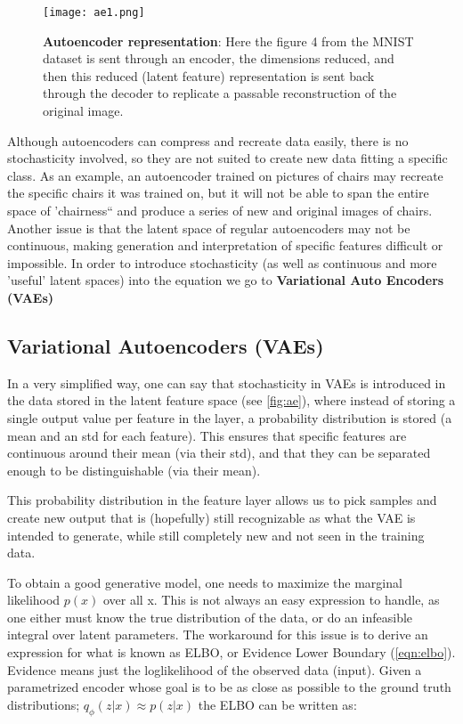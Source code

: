 \begin{figure}[!htb]
 \centering
 \texttt{[image: ae1.png]}
 \caption{\textbf{Autoencoder representation}: Here the figure 4 from the MNIST dataset is sent through an encoder, the dimensions reduced, and then this reduced (latent feature) representation is sent back through the decoder to replicate a passable reconstruction of the original image.}
 \label{fig:ae}
\end{figure}

Although autoencoders can compress and recreate data easily, there is no stochasticity involved, so they are not suited to create new data fitting a specific class. As an example, an autoencoder trained on pictures of chairs may recreate the specific chairs it was trained on, but it will not be able to span the entire space of 'chairness`` and produce a series of new and original images of chairs. Another issue is that the latent space of regular autoencoders may not be continuous, making generation and interpretation of specific features difficult or impossible.
In order to introduce stochasticity (as well as continuous and more 'useful' latent spaces) into the equation we go to \textbf{Variational Auto Encoders (VAEs)}

\subsection{Variational Autoencoders (VAEs)}
In a very simplified way, one can say that stochasticity in VAEs is introduced in the data stored in the latent feature space (see \autoref{fig:ae}), where instead of storing a single output value per feature in the layer, a probability distribution is stored (a mean and an std for each feature). This ensures that specific features are continuous around their mean (via their std), and that they can be separated enough to be distinguishable (via their mean).

This probability distribution in the feature layer allows us to pick samples and create new output that is (hopefully) still recognizable as what the VAE is intended to generate, while still completely new and not seen in the training data. 

To obtain a good generative model, one needs to maximize the marginal likelihood $p(x)$ over all x. This is not always an easy expression to handle, as one either must know the true distribution of the data, or do an infeasible integral over latent parameters. The workaround for this issue is to derive an expression for what is known as ELBO, or Evidence Lower Boundary (\autoref{eqn:elbo}). Evidence means just the loglikelihood of the observed data (input).
Given a parametrized encoder whose goal is to be as close as possible to the ground truth distributions; $q_\phi(z|x)\approx p(z|x)$ the ELBO can be written as:

